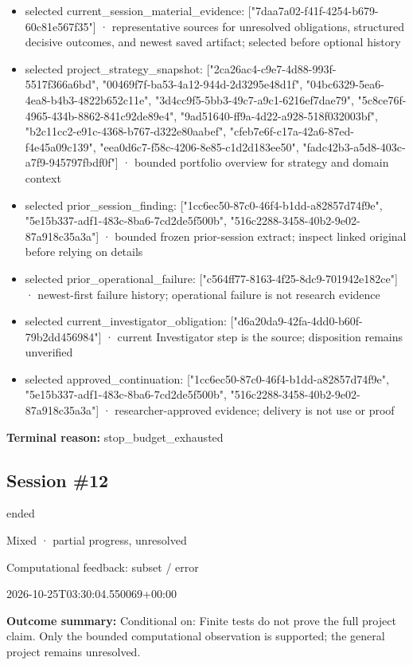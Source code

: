 \documentclass[11pt]{article}
\begin{document}
\begin{itemize}
\item selected current\_session\_material\_evidence: ["7daa7a02-f41f-4254-b679-60c81e567f35"] · representative sources for unresolved obligations, structured decisive outcomes, and newest saved artifact; selected before optional history
\item selected project\_strategy\_snapshot: ["2ca26ac4-c9e7-4d88-993f-5517f366a6bd", "00469f7f-ba53-4a12-944d-2d3295e48d1f", "04bc6329-5ea6-4ea8-b4b3-4822b652c11e", "3d4cc9f5-5bb3-49c7-a9c1-6216ef7dae79", "5c8ce76f-4965-434b-8862-841c92de89e4", "9ad51640-ff9a-4d22-a928-518f032003bf", "b2c11cc2-e91c-4368-b767-d322e80aabef", "cfeb7e6f-c17a-42a6-87ed-f4e45a09c139", "eea0d6c7-f58c-4206-8e85-c1d2d183ee50", "fadc42b3-a5d8-403c-a7f9-945797fbdf0f"] · bounded portfolio overview for strategy and domain context
\item selected prior\_session\_finding: ["1cc6ec50-87c0-46f4-b1dd-a82857d74f9e", "5e15b337-adf1-483c-8ba6-7cd2de5f500b", "516c2288-3458-40b2-9e02-87a918c35a3a"] · bounded frozen prior-session extract; inspect linked original before relying on details
\item selected prior\_operational\_failure: ["c564ff77-8163-4f25-8dc9-701942e182ce"] · newest-first failure history; operational failure is not research evidence
\item selected current\_investigator\_obligation: ["d6a20da9-42fa-4dd0-b60f-79b2dd456984"] · current Investigator step is the source; disposition remains unverified
\item selected approved\_continuation: ["1cc6ec50-87c0-46f4-b1dd-a82857d74f9e", "5e15b337-adf1-483c-8ba6-7cd2de5f500b", "516c2288-3458-40b2-9e02-87a918c35a3a"] · researcher-approved evidence; delivery is not use or proof
\end{itemize}
\textbf{Terminal reason:} stop\_budget\_exhausted\par
\subsection{Session \#12}
\begin{description}[style=nextline,font=\normalfont\bfseries,leftmargin=0pt,labelsep=0pt]
\item[Execution status] ended
\item[Outcome] Mixed · partial progress, unresolved
\item[Strategy] Computational feedback: subset / error
\item[Started] 2026-10-25T03:30:04.550069+00:00
\end{description}
\textbf{Outcome summary:} Conditional on: Finite tests do not prove the full project claim. Only the bounded computational observation is supported; the general project remains unresolved.\par
\end{document}
